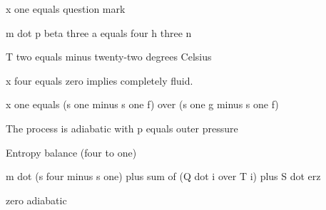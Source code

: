 x one equals question mark

m dot p beta three a equals four h three n

T two equals minus twenty-two degrees Celsius

x four equals zero implies completely fluid.

x one equals (s one minus s one f) over (s one g minus s one f)

The process is adiabatic with p equals outer pressure

Entropy balance (four to one)

m dot (s four minus s one) plus sum of (Q dot i over T i) plus S dot erz

zero adiabatic